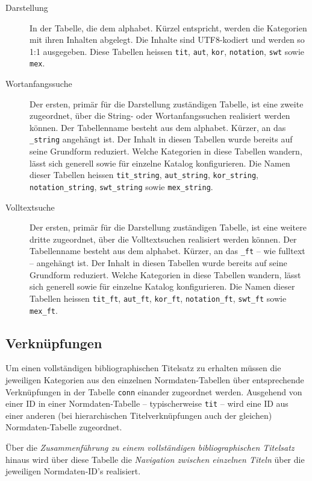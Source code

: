 \documentclass[11pt, twoside, a4paper, BCOR8mm, DIV12, bibtotoc,idxtotoc]{scrbook}
\begin{document}
\begin{description}
\item[Darstellung] In der Tabelle, die dem alphabet. Kürzel
  entspricht, werden die Kategorien mit ihren Inhalten abgelegt. Die
  Inhalte sind UTF8-kodiert und werden so 1:1 ausgegeben. Diese
  Tabellen heissen \texttt{tit}, \texttt{aut}, \texttt{kor},
  \texttt{notation}, \texttt{swt} sowie \texttt{mex}.
\item[Wortanfangssuche] Der ersten, primär für die Darstellung
  zuständigen Tabelle, ist eine zweite zugeordnet, über die String-
  oder Wortanfangssuchen realisiert werden können. Der Tabellen\-name
  besteht aus dem alphabet. Kürzer, an das \texttt{\_string} angehängt
  ist. Der Inhalt in diesen Tabellen wurde bereits auf seine Grundform
  reduziert. Welche Kategorien in diese Tabellen wandern, lässt sich
  generell sowie für einzelne Katalog konfigurieren. Die Namen dieser
  Tabellen heissen \texttt{tit\_string}, \texttt{aut\_string},
  \texttt{kor\_string}, \texttt{notation\_string},
  \texttt{swt\_string} sowie \texttt{mex\_string}.
\item[Volltextsuche] Der ersten, primär für die Darstellung
  zuständigen Tabelle, ist eine weitere dritte zugeordnet, über die
  Volltextsuchen realisiert werden können. Der Tabellen\-name besteht
  aus dem alphabet. Kürzer, an das \texttt{\_ft} -- wie fulltext --
  angehängt ist. Der Inhalt in diesen Tabellen wurde bereits auf seine
  Grundform reduziert. Welche Kategorien in diese Tabellen wandern,
  lässt sich generell sowie für einzelne Katalog konfigurieren. Die
  Namen dieser Tabellen heissen \texttt{tit\_ft}, \texttt{aut\_ft},
  \texttt{kor\_ft}, \texttt{notation\_ft}, \texttt{swt\_ft} sowie
  \texttt{mex\_ft}.
\end{description}

\subsection{Verknüpfungen}

Um einen vollständigen bibliographischen Titelsatz zu erhalten müssen
die jeweiligen Kategorien aus den einzelnen Normdaten-Tabellen über
entsprechende Verknüpfungen in der Tabelle \texttt{conn} einander
zugeordnet werden. Ausgehend von einer ID in einer Normdaten-Tabelle
-- typischerweise \texttt{tit} -- wird eine ID aus einer anderen (bei
hierarchischen Titelverknüpfungen auch der gleichen) Normdaten-Tabelle
zugeordnet.

Über die \emph{Zusammenführung zu einem vollständigen bibliographischen
Titelsatz} hinaus wird über diese Tabelle die \emph{Navigation zwischen
  einzelnen Titeln} über die jeweiligen Normdaten-ID's realisiert.
\end{document}
